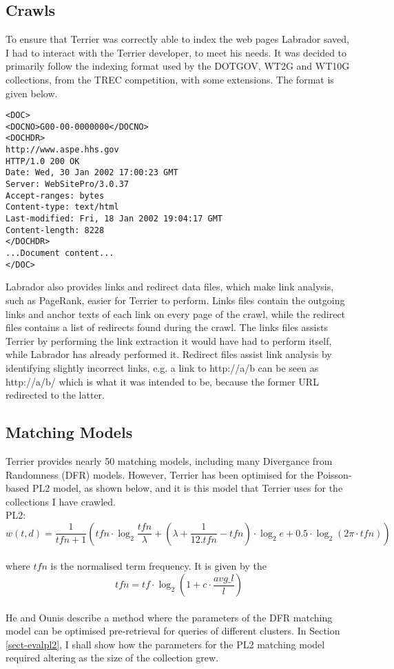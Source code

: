 \subsection{Crawls}
To ensure that Terrier was correctly able to index the web pages Labrador saved, I had to interact with the Terrier developer, to meet his needs. It was decided to primarily follow the indexing format used by the DOTGOV\cite{site2}, WT2G and WT10G\cite{site3} collections, from the TREC competition, with some extensions. The format is given below.
\renewcommand{\baselinestretch}{1.0}
\begin{verbatim}
<DOC>
<DOCNO>G00-00-0000000</DOCNO>
<DOCHDR>
http://www.aspe.hhs.gov
HTTP/1.0 200 OK
Date: Wed, 30 Jan 2002 17:00:23 GMT
Server: WebSitePro/3.0.37
Accept-ranges: bytes
Content-type: text/html
Last-modified: Fri, 18 Jan 2002 19:04:17 GMT
Content-length: 8228
</DOCHDR>
...Document content...
</DOC>
\end{verbatim}
\renewcommand{\baselinestretch}{1.5}
Labrador also provides links and redirect data files, which make link analysis, such as PageRank\cite{Lawrence981}, easier for Terrier to perform. Links files contain the outgoing links and anchor texts of each link on every page of the crawl, while the redirect files contains a list of redirects found during the crawl. The links files assists Terrier by performing the link extraction it would have had to perform itself, while Labrador has already performed it. Redirect files assist link analysis by identifying slightly incorrect links, e.g. a link to http://a/b can be seen as http://a/b/ which is what it was intended to be, because the former URL redirected to the latter.

\subsection{Matching Models}\label{sect-terriermatching}
Terrier provides nearly 50 matching models, including many Divergance from Randomness (DFR) models\cite{ref14}. However, Terrier has been optimised for the Poisson-based PL2\cite{ref13,ref14} model, as shown below, and it is this model that Terrier uses for the collections I have crawled.\\
PL2: \indent \begin{equation}\label{pl2} w(t,d) = \frac{1}{tfn +1}(tfn \cdot \log_2 \frac{tfn}{\lambda} + (\lambda + \frac{1}{12.tfn} - tfn) \cdot \log_2 e + 0.5 \cdot \log_2(2\pi \cdot tfn))\end{equation}\\
where $tfn$ is the normalised term frequency. It is given by the
\begin{equation}\label{eNormalisation2}
    tfn=tf\cdot\log_2(1+c\cdot\frac{avg\_l}{l})
\end{equation}
\ \\
He and Ounis\cite{ref13} describe a method where the parameters of the DFR matching model can be optimised pre-retrieval for queries of different clusters. In Section \ref{sect-evalpl2}, I shall show how the parameters for the PL2 matching model required altering as the size of the collection grew.

